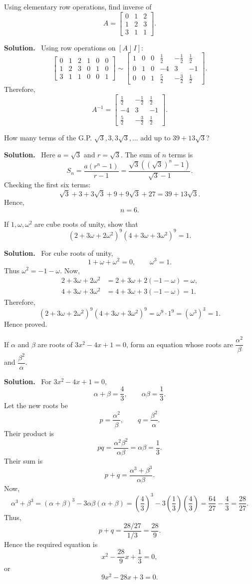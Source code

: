\documentclass[11pt,a4paper]{article}
\newcommand{\question}[2]{\begin{tcolorbox}[breakable,colback=gray!5,colframe=black!35,title=\textbf{Question #1}]#2\end{tcolorbox}}
\newcommand{\answer}{\textbf{Solution.}\ }
\begin{document}
\question{2(a)}{Using elementary row operations, find inverse of
\[
A=\begin{bmatrix}0&1&2\\1&2&3\\3&1&1\end{bmatrix}.
\]}
\answer
Using row operations on $[A\mid I]$:
\[
\left[\begin{array}{ccc|ccc}
0&1&2&1&0&0\\
1&2&3&0&1&0\\
3&1&1&0&0&1
\end{array}\right]
\sim
\left[\begin{array}{ccc|ccc}
1&0&0&\frac12&-\frac12&\frac12\\
0&1&0&-4&3&-1\\
0&0&1&\frac52&-\frac32&\frac12
\end{array}\right].
\]
Therefore,
\[
\boxed{A^{-1}=\begin{bmatrix}
\frac12&-\frac12&\frac12\\
-4&3&-1\\
\frac52&-\frac32&\frac12
\end{bmatrix}.}
\]

\question{2(b)}{How many terms of the G.P. $\sqrt3,3,3\sqrt3,\ldots$ add up to $39+13\sqrt3$?}
\answer
Here $a=\sqrt3$ and $r=\sqrt3$. The sum of $n$ terms is
\[
S_n=\frac{a(r^n-1)}{r-1}
=\frac{\sqrt3\left((\sqrt3)^n-1\right)}{\sqrt3-1}.
\]
Checking the first six terms:
\[
\sqrt3+3+3\sqrt3+9+9\sqrt3+27=39+13\sqrt3.
\]
Hence,
\[
\boxed{n=6.}
\]

\question{2(c)}{If $1,\omega,\omega^2$ are cube roots of unity, show that
\[
(2+3\omega+2\omega^2)^9(4+3\omega+3\omega^2)^9=1.
\]}
\answer
For cube roots of unity,
\[
1+\omega+\omega^2=0,
\qquad \omega^3=1.
\]
Thus $\omega^2=-1-\omega$. Now,
\begin{align*}
2+3\omega+2\omega^2
&=2+3\omega+2(-1-\omega)=\omega,\\
4+3\omega+3\omega^2
&=4+3\omega+3(-1-\omega)=1.
\end{align*}
Therefore,
\[
(2+3\omega+2\omega^2)^9(4+3\omega+3\omega^2)^9
=\omega^9\cdot 1^9=(\omega^3)^3=1.
\]
Hence proved.

\question{2(d)}{If $\alpha$ and $\beta$ are roots of $3x^2-4x+1=0$, form an equation whose roots are $\dfrac{\alpha^2}{\beta}$ and $\dfrac{\beta^2}{\alpha}$.}
\answer
For $3x^2-4x+1=0$,
\[
\alpha+\beta=\frac43,
\qquad \alpha\beta=\frac13.
\]
Let the new roots be
\[
p=\frac{\alpha^2}{\beta},
\qquad q=\frac{\beta^2}{\alpha}.
\]
Their product is
\[
pq=\frac{\alpha^2\beta^2}{\alpha\beta}=\alpha\beta=\frac13.
\]
Their sum is
\[
p+q=\frac{\alpha^3+\beta^3}{\alpha\beta}.
\]
Now,
\[
\alpha^3+\beta^3=(\alpha+\beta)^3-3\alpha\beta(\alpha+\beta)
=\left(\frac43\right)^3-3\left(\frac13\right)\left(\frac43\right)
=\frac{64}{27}-\frac43=\frac{28}{27}.
\]
Thus,
\[
p+q=\frac{28/27}{1/3}=\frac{28}{9}.
\]
Hence the required equation is
\[
x^2-\frac{28}{9}x+\frac13=0,
\]
or
\[
\boxed{9x^2-28x+3=0.}
\]
\end{document}
